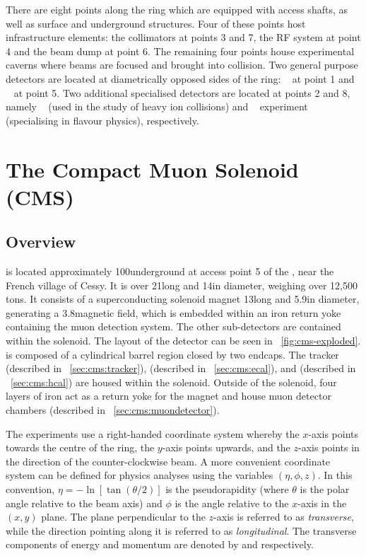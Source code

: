 There are eight points along the \LHC ring which are equipped with access shafts, as well as surface and underground structures. Four of these points host \LHC infrastructure elements: the collimators at points 3 and 7, the RF system at point 4 and the beam dump at point 6. The remaining four points house experimental caverns where beams are focused and brought into collision. Two general purpose detectors are located at diametrically opposed sides of the ring: \ATLAS~\cite{AtlasatLHC} at point 1 and \CMS~\cite{CMSatLHC} at point 5. Two additional specialised detectors are located at points 2 and 8, namely \ALICE~\cite{AliceatLHC} (used in the study of heavy ion collisions) and \LHCb~\cite{LHCbatLHC} experiment (specialising in flavour physics), respectively. 



\section{The Compact Muon Solenoid (CMS)}
\label{sec:cms}

\subsection{Overview}
\label{sec:cms:overview}

\CMS is located approximately 100\m underground at access point 5 of the \LHC, near the French village of Cessy. It is over 21\m long and 14\m in diameter, weighing over 12,500 tons. It consists of a superconducting solenoid magnet 13\m long and 5.9\m in diameter, generating a 3.8\T magnetic field, which is embedded within an iron return yoke containing the muon detection system. The other sub-detectors are contained within the solenoid. The layout of the \CMS detector can be seen in \Fig~\ref{fig:cms-exploded}. \CMS is composed of a cylindrical barrel region closed by two endcaps. The tracker (described in \Sec~\ref{sec:cms:tracker}), \ECAL (described in \Sec~\ref{sec:cms:ecal}), and \HCAL (described in \Sec~\ref{sec:cms:hcal}) are housed within the solenoid. Outside of the solenoid, four layers of iron act as a return yoke for the magnet and house muon detector chambers (described in \Sec~\ref{sec:cms:muondetector}). 

The \LHC experiments use a right-handed coordinate system whereby the $x$-axis points towards the centre of the \LHC ring, the $y$-axis points upwards, and the $z$-axis points in the direction of the counter-clockwise beam. A more convenient coordinate system can be defined for physics analyses using the variables $(\eta,\phi,z)$. In this convention, $\eta = -\ln [ \tan(\theta/2)]$ is the pseudorapidity (where $\theta$ is the polar angle relative to the beam axis) and $\phi$ is the angle relative to the $x$-axis in the $(x,y)$ plane. The plane perpendicular to the $z$-axis is referred to as \emph{transverse}, while the direction pointing along it is referred to as \emph{longitudinal}. The transverse components of energy and momentum are denoted by \ET and \pT respectively. 

